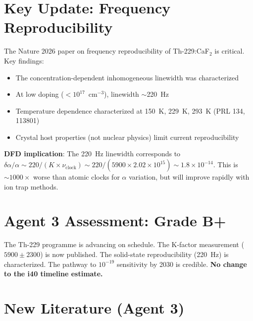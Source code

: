 \documentclass[11pt,a4paper]{article}
\begin{document}
\section{Key Update: Frequency Reproducibility}

The Nature 2026 paper on frequency reproducibility of Th-229:CaF$_2$ is critical. Key findings:
\begin{itemize}
\item The concentration-dependent inhomogeneous linewidth was characterized
\item At low doping ($< 10^{17}$~cm$^{-3}$), linewidth $\sim$220~Hz
\item Temperature dependence characterized at 150~K, 229~K, 293~K (PRL 134, 113801)
\item Crystal host properties (not nuclear physics) limit current reproducibility
\end{itemize}

\textbf{DFD implication}: The 220~Hz linewidth corresponds to $\delta\alpha/\alpha \sim 220/(K \times \nu_{\text{clock}}) \sim 220/(5900 \times 2.02 \times 10^{15}) \sim 1.8 \times 10^{-14}$. This is $\sim 1000\times$ worse than atomic clocks for $\alpha$ variation, but will improve rapidly with ion trap methods.

\section{Agent 3 Assessment: Grade B+}

The Th-229 programme is advancing on schedule. The K-factor measurement ($5900 \pm 2300$) is now published. The solid-state reproducibility (220~Hz) is characterized. The pathway to $10^{-19}$ sensitivity by 2030 is credible. \textbf{No change to the i40 timeline estimate.}

\section{New Literature (Agent 3)}
\end{document}
